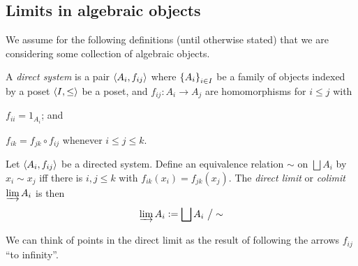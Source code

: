 \documentclass[11pt]{article}
\begin{document}
\subsection{Limits in algebraic objects}
We assume for the following definitions (until otherwise stated) that we are considering some collection of algebraic objects.
\begin{definition}
    A \emph{direct system} is a pair $\left\langle A_i, f_{ij} \right\rangle$ where $\left\{  A_i  \right\}_{i \in I}$ be a family of objects indexed by a poset $\left\langle I, \leq \right\rangle$ be a poset, and $f_{ij} : A_i \to A_j$ are homomorphisms for $i \leq j$ with
    \begin{enum}
        \item $f_{ii} = 1_{A_i}$; and
        \item $f_{ik} = f_{jk} \circ f_{ij}$ whenever $i \leq j \leq k$.
    \end{enum}
\end{definition}
\begin{definition}
    Let $\left\langle A_i, f_{ij} \right\rangle$ be a directed system. Define an equivalence relation $\sim$ on $\bigsqcup A_i$ by $x_i \sim x_j$ iff there is $i, j \leq k$ with $f_{ik}(x_i) = f_{jk}(x_j)$. The \emph{direct limit} or \emph{colimit} $\varinjlim A_i$ is then
    $$
        \varinjlim A_i \vcentcolon= \bigsqcup A_i \ \big/ \sim
    $$
\end{definition}
We can think of points in the direct limit as the result of following the arrows $f_{ij}$ ``to infinity''.
\end{document}
